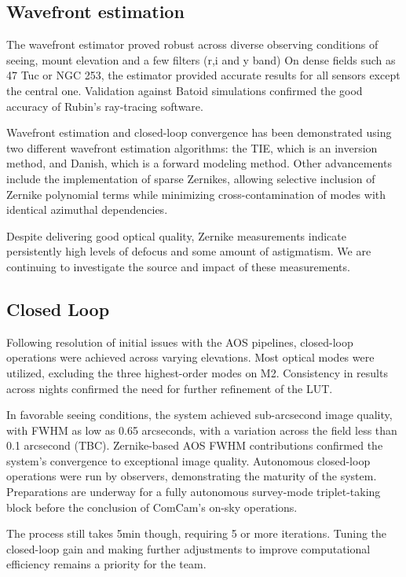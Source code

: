 \subsection{Wavefront estimation}
The wavefront estimator proved robust across diverse observing conditions of seeing, mount elevation and a few filters (r,i and y band) 
On dense fields such as 47 Tuc or NGC 253, the estimator provided accurate results for 
all sensors except the central one. Validation against Batoid simulations confirmed 
the good accuracy of Rubin's ray-tracing software.

Wavefront estimation and closed-loop convergence has been demonstrated using two different
wavefront estimation algorithms: the TIE, which is an inversion method, and Danish, which
is a forward modeling method. Other advancements include the implementation of sparse Zernikes, 
allowing selective inclusion of Zernike polynomial terms while minimizing cross-contamination 
of modes with identical azimuthal dependencies.

Despite delivering good optical quality, Zernike measurements indicate persistently high
levels of defocus and some amount of astigmatism. We are continuing to investigate the
source and impact of these measurements.

\subsection{Closed Loop}
Following resolution of initial issues with the AOS pipelines, 
closed-loop operations were achieved across varying elevations. 
Most optical modes were utilized, excluding the three highest-order modes on M2. 
Consistency in results across nights confirmed the need for further refinement of the LUT.

In favorable seeing conditions, the system achieved sub-arcsecond image 
quality, with FWHM as low as 0.65 arcseconds, with a variation across the field less than 0.1 arcsecond (TBC). Zernike-based AOS FWHM 
contributions confirmed the system's convergence to exceptional image 
quality. Autonomous closed-loop operations were run by observers, 
demonstrating the maturity of the system. Preparations are underway 
for a fully autonomous survey-mode triplet-taking block before the 
conclusion of ComCam's on-sky operations.

The process still takes 5min though, requiring 5 or more iterations. Tuning the closed-loop gain and making further adjustments to improve computational 
efficiency remains a priority for the team.

